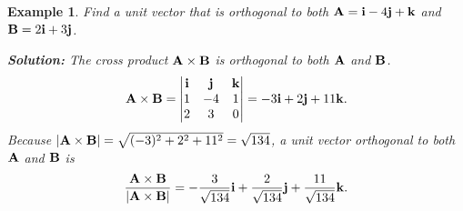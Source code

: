 \documentclass[titlepage,a4paper,12pt]{report}
\newtheorem{example}{Example}[section]
\begin{document}
\begin{example}
Find a unit vector that is orthogonal to both ${\bf{A}}={\bf{i}}-4{\bf{j}}+{\bf{k}}$ and ${\bf{B}}=2{\bf{i}}+3{\bf{j}}$.

\noindent \textbf{Solution:} The cross product ${\bf{A}\times \bf{B}}$ is orthogonal to both ${\bf{A}}$ and ${\bf{B}}$.\[{\bf{A}\times \bf{B}}=\begin{vmatrix}
{\bf{i}} & {\bf{j}} & {\bf{k}} \\
1 & -4 & 1 \\
2 & 3 & 0 
\end{vmatrix} = -3{\bf{i}}+2{\bf{j}}+11{\bf{k}}.\] Because $|{\bf{A}\times \bf{B}}| =\sqrt{(-3)^2+2^2+11^2}=\sqrt{134}$, a unit vector orthogonal to both ${\bf{A}}$ and ${\bf{B}}$ is \[\dfrac{{\bf{A}\times \bf{B}}}{|{\bf{A}\times \bf{B}}|}=-\dfrac{3}{\sqrt{134}}{\bf{i}}+\dfrac{2}{\sqrt{134}}{\bf{j}}+\dfrac{11}{\sqrt{134}}{\bf{k}}.\]
\end{example}
\end{document}
